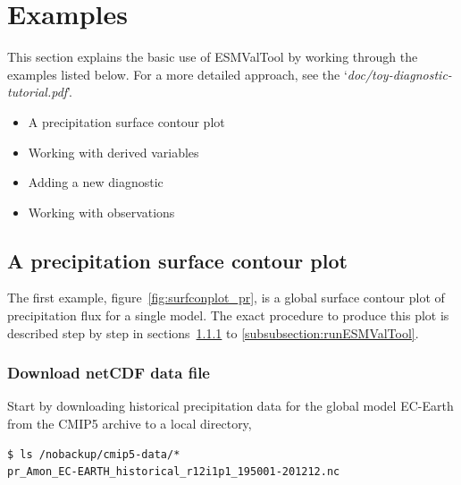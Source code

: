 \documentclass[12pt]{article}
\newcommand{\docref}[1]{`\emph{#1}'}
\begin{document}
\section{Examples}\label{section:plottingExamples}
This section explains the basic use of ESMValTool by working through
the examples listed below. For a more detailed approach, see the
\docref{doc/toy-diagnostic-tutorial.pdf}.
\begin{itemize}
\item[\ref{subsection:examplePrecip}] A precipitation surface contour plot
\item[\ref{subsection:derivedVariable}] Working with derived variables
\item[\ref{subsection:addingDiagnostic}] Adding a new diagnostic
\item[\ref{subsection:observations}] Working with observations
\end{itemize}
 

\subsection{A precipitation surface contour plot}\label{subsection:examplePrecip}
The first example, figure~\ref{fig:surfconplot_pr}, is a global
surface contour plot of precipitation flux for a single model. The
exact procedure to produce this plot is described step by step in
sections~\ref{subsubsection:netcdf-file} to
\ref{subsubsection:runESMValTool}. 


\subsubsection{Download netCDF data file}\label{subsubsection:netcdf-file}
Start by downloading historical precipitation data for the global
model EC-Earth from the CMIP5 archive to a local directory,  
\footnotesize
\begin{Verbatim}[frame=single, fontsize=\footnotesize]
$ ls /nobackup/cmip5-data/*
pr_Amon_EC-EARTH_historical_r12i1p1_195001-201212.nc
\end{Verbatim}
\normalsize

\end{document}

